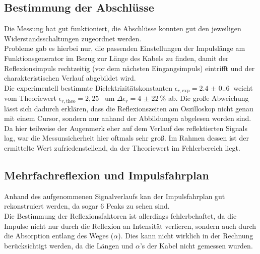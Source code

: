
\subsection{Bestimmung der Abschlüsse}

Die Messung hat gut funktioniert, die Abschlüsse konnten gut den jeweiligen Widerstandsschaltungen zugeordnet werden. \\
Probleme gab es hierbei nur, die passenden Einstellungen der Impulslänge am Funktionsgenerator im Bezug zur Länge des Kabels zu finden, damit der Reflexionsimpuls rechtzeitig (vor dem nächsten Eingangsimpuls) eintrifft und der charakteristischen Verlauf abgebildet wird. \\
Die experimentell bestimmte Dielektrizitätskonstanten $\epsilon_{r, \text{exp}} = \qty{2.4(0.6)}{}$ weicht vom Theoriewert $\epsilon_{r, \text{theo}} = 2,25$~\cite{Durchfuhrung} um $\Delta \epsilon_r = \qty{4(22)}{\%}$ ab. Die große Abweichung lässt sich dadurch erklären, dass die Reflexionszeiten am Oszilloskop nicht genau mit einem Cursor, sondern nur anhand der Abbildungen abgelesen worden sind. Da hier teilweise der Augenmerk eher auf dem Verlauf des reflektierten Signals lag, war die Messunsicherheit hier oftmals sehr groß. Im Rahmen dessen ist der ermittelte Wert zufriedenstellend, da der Theoriewert im Fehlerbereich liegt.

\subsection{Mehrfachreflexion und Impulsfahrplan}

Anhand des aufgenommenen Signalverlaufs kan der Impulsfahrplan gut rekonstruiert werden, da sogar 6 Peaks zu sehen sind. \\
Die Bestimmung der Reflexionsfaktoren ist allerdings fehlerbehaftet, da die Impulse nicht nur durch die Reflexion an Intensität verlieren, sondern auch durch die Absorption entlang des Weges ($\alpha$). Dies kann nicht wirklich in der Rechnung berücksichtigt werden, da die Längen und $\alpha$'s der Kabel nicht gemessen wurden.


\clearpage